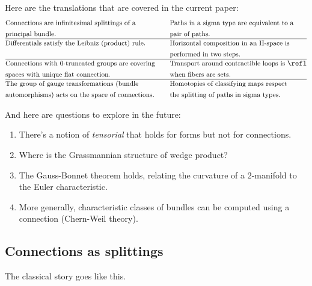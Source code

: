 Here are the translations that are covered in the current paper:
\[\begin{aligned}
& \text{\small Connections are infinitesimal splittings of a} & \quad &\text{\small Paths in a sigma type are equivalent to a}        \\
& \text{\small principal bundle.} & \quad&\text{\small pair of paths.}        \\ \hline
& \text{\small Differentials satisfy the Leibniz (product) rule.} &\quad  &\text{\small Horizontal composition in an H-space is} \\ 
&  &  \quad&\text{\small performed in two steps.} \\ \hline
& \text{\small Connections with 0-truncated groups are covering}        &\quad &\text{\small Transport around contractible loops is } \refl             \\ 
& \text{\small spaces with unique flat connection.}        & \quad&\text{\small when fibers are sets.}             \\ \hline
& \text{\small The group of gauge transformations (bundle} &\quad &\text{\small Homotopies of classifying maps respect } \\ 
& \text{\small automorphisms) acts on the space of connections.} & \quad&\text{\small the splitting of paths in sigma types.} \\ 
\end{aligned}\]

And here are questions to explore in the future:

\begin{enumerate}
\item
  There's a notion of \emph{tensorial} that holds for forms but not for
  connections.
\item
  Where is the Grassmannian structure of wedge product?
\item
  The Gauss-Bonnet theorem holds, relating the curvature of a 2-manifold
  to the Euler characteristic.
\item
  More generally, characteristic classes of bundles can be computed
  using a connection (Chern-Weil theory).
\end{enumerate}

\subsection{Connections as splittings}\label{connections-as-splittings}

The classical story goes like this.

